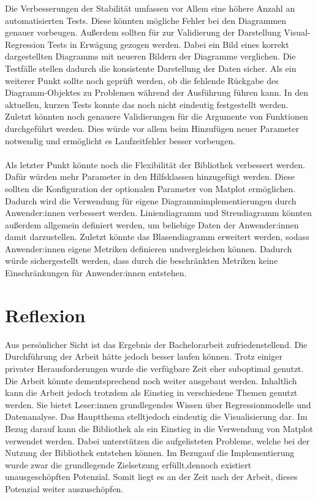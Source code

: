 \noindent Die Verbesserungen der Stabilität umfassen vor Allem eine höhere Anzahl an automatisierten Tests. Diese könnten mögliche Fehler bei den Diagrammen genauer vorbeugen. Außerdem sollten für zur Validierung der Darstellung Visual-Regression Tests\linebreak \parencite{VisualRegression} in Erwägung gezogen werden. Dabei ein Bild eines korrekt dargestellten Diagramms mit neueren Bildern der Diagramme verglichen. Die Testfälle stellen dadurch die konsistente Darstellung der Daten sicher. Als ein weiterer Punkt sollte noch geprüft werden, ob die fehlende Rückgabe des Diagramm-Objektes zu Problemen während der Ausführung führen kann. In den aktuellen, kurzen Tests konnte das noch nicht eindeutig festgestellt werden. Zuletzt könnten noch genauere Validierungen für die Argumente von Funktionen durchgeführt werden. Dies würde vor allem beim Hinzufügen neuer Parameter notwendig und ermöglicht es Laufzeitfehler besser vorbeugen.\\\\
\noindent Als letzter Punkt könnte noch die Flexibilität der Bibliothek verbessert werden. Dafür würden mehr Parameter in den Hilfsklassen hinzugefügt werden. Diese sollten die Konfiguration der optionalen Parameter von Matplot ermöglichen. Dadurch wird die Verwendung für eigene Diagrammimplementierungen durch Anwender:innen verbessert werden. Liniendiagramm und Streudiagramm könnten außerdem allgemein definiert werden, um beliebige Daten der Anwender:innen damit darzustellen. Zuletzt könnte das Blasendiagramm erweitert werden, sodass Anwender:innen eigene Metriken definieren und\linebreak vergleichen können. Dadurch würde sichergestellt werden, dass durch die beschränkten Metriken keine Einschränkungen für Anwender:innen entstehen.

\section{Reflexion}
\label{sec:ausblick}

Aus persönlicher Sicht ist das Ergebnis der Bachelorarbeit zufriedenstellend. Die Durchführung der Arbeit hätte jedoch besser laufen können. Trotz einiger privater Herausforderungen wurde die verfügbare Zeit eher suboptimal genutzt. Die Arbeit könnte dementsprechend noch weiter ausgebaut werden. Inhaltlich kann die Arbeit jedoch trotzdem als Einstieg in verschiedene Themen genutzt werden. Sie bietet Leser:innen grundlegendes Wissen über Regressionmodelle und Datenanalyse. Das Hauptthema stellt\linebreak jedoch eindeutig die Visualisierung dar. Im Bezug darauf kann die Bibliothek als ein Einstieg in die Verwendung von Matplot verwendet werden. Dabei unterstützen die aufgelisteten Probleme, welche bei der Nutzung der Bibliothek entstehen können. Im Bezug\linebreak auf die Implementierung wurde zwar die grundlegende Zielsetzung erfüllt,\linebreak dennoch existiert unausgeschöpften Potenzial. Somit liegt es an der Zeit nach der Arbeit, dieses Potenzial weiter auszuschöpfen. 

